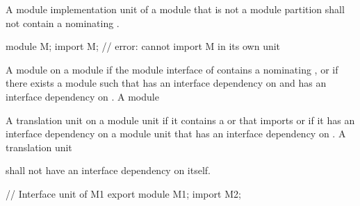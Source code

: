 \begin{std.txt}
%

  \alinea
  A module implementation unit of a module 
  that is not a module partition
  shall not contain a 
  nominating .
  \begin{example}
  \begin{codeblock}
     module M;
     import M;          // error: cannot import M in its own unit
  \end{codeblock} 
  \end{example}

  \alinea
\begin{before}\color{addclr}
  A module   on a module
   if the module interface of  contains a
   nominating ,
  or if there exists a module  such that  has an
  interface dependency on  and  has an interface dependency
  on .  A module
\end{before}
\begin{after}\color{addclr}
  A translation unit  on a module unit 
  if it contains a  or
   that imports  or if it has
  an interface dependency on a module unit that has an interface dependency on .
  A translation unit
\end{after}
  shall not have an interface dependency on itself.
  \begin{example}
  \begin{Program}
     // Interface unit of M1
     export module M1;
     import M2;


\end{Program}
\end{example}
\end{std.txt}
